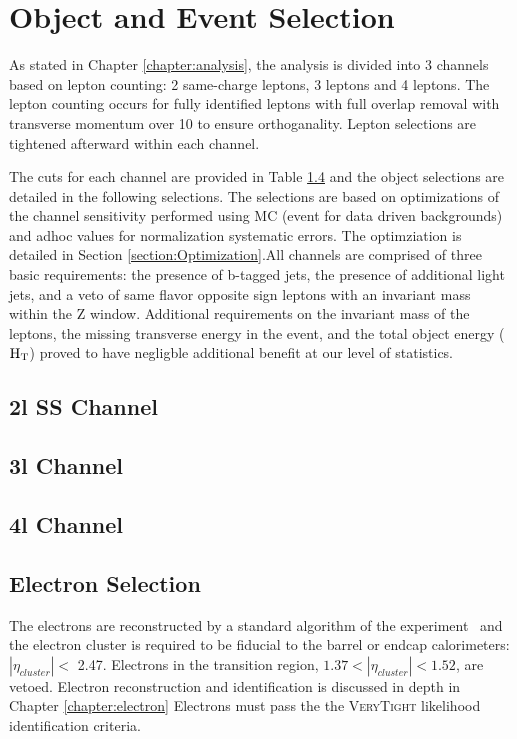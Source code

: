 \chapter[Object and Event Selection][Object and Event Selection]{Object and Event Selection}
\label{chapter:selection}

As stated in Chapter \ref{chapter:analysis}, the analysis is divided into 3 channels based
on lepton counting: 2 same-charge leptons, 3 leptons and 4 leptons. The lepton
counting occurs for fully identified leptons with full overlap removal with
transverse momentum over 10 \gev to ensure orthoganality. Lepton selections are tightened
afterward within each channel.

The cuts for each channel are provided in Table \ref{} and the object selections are detailed in the
following selections. The selections are based on optimizations of the channel sensitivity
performed using MC (event for data driven backgrounds) and adhoc values for normalization systematic errors. The optimziation is
detailed in Section \ref{section:Optimization}.All channels are comprised of three basic requirements: the presence of b-tagged
jets, the presence of additional light jets, and a veto of same flavor opposite sign leptons with an
invariant mass within the Z window. Additional requirements on the invariant mass of the leptons, the missing transverse energy
in the event, and the total object energy ($\rm H_{T}$) proved to have negligble additional benefit at our level of 
statistics.


\section{2l SS Channel}

\section{3l Channel}

\section{4l Channel}

\section{Electron Selection}

The electrons are reconstructed by a standard algorithm of the
experiment~\cite{EgammaSF} and the electron cluster is required to be fiducial 
to the barrel or endcap calorimeters: $|\eta_{cluster}| < $ 2.47. Electrons
in the transition region, $1.37 < |\eta_{cluster}| < 1.52$, are vetoed.
Electron reconstruction and identification is discussed in depth in Chapter \ref{chapter:electron}
Electrons must pass the the \textsc{VeryTight} likelihood identification criteria.

